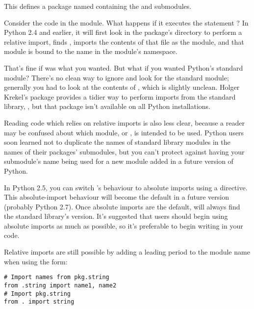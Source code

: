 \documentclass{howto}
\begin{document}
This defines a package named  containing the
 and  submodules.  

Consider the code in the  module.  What happens if it
executes the statement ?  In Python 2.4 and
earlier, it will first look in the package's directory to perform a
relative import, finds , imports the contents of
that file as the  module, and that module is bound
to the name  in the  module's namespace.

That's fine if  was what you wanted.  But what if
you wanted Python's standard  module?  There's no clean
way to ignore  and look for the standard module;
generally you had to look at the contents of , which
is slightly unclean.   
Holger Krekel's  package provides a tidier way to perform
imports from the standard library, ,
but that package isn't available on all Python installations.

Reading code which relies on relative imports is also less clear,
because a reader may be confused about which module, 
or , is intended to be used.  Python users soon
learned not to duplicate the names of standard library modules in the
names of their packages' submodules, but you can't protect against
having your submodule's name being used for a new module added in a
future version of Python.

In Python 2.5, you can switch 's behaviour to 
absolute imports using a 
directive.  This absolute-import behaviour will become the default in
a future version (probably Python 2.7).  Once absolute imports 
are the default,  will
always find the standard library's version.
It's suggested that users should begin using absolute imports as much
as possible, so it's preferable to begin writing  in your code.  

Relative imports are still possible by adding a leading period 
to the module name when using the  form:

\begin{verbatim}
# Import names from pkg.string
from .string import name1, name2
# Import pkg.string
from . import string
\end{verbatim}
\end{document}
